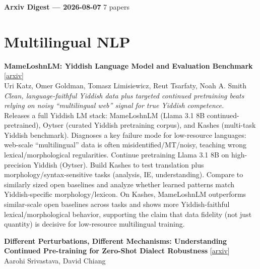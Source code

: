 \documentclass[12pt,letterpaper]{article}
\begin{document}
{\footnotesize\textbf{Arxiv Digest --- 2026-08-07} \hfill 7 papers}

\smallskip

\section*{Multilingual NLP}

{\small\textbf{MameLoshnLM: Yiddish Language Model and Evaluation Benchmark}} {\scriptsize[\href{https://arxiv.org/abs/2608.05850}{arxiv}]}\\
{\scriptsize Uri Katz, Omer Goldman, Tomasz Limisiewicz, Reut Tsarfaty, Noah A. Smith}\\

{\small\textit{Clean, language-faithful Yiddish data plus targeted continued pretraining beats relying on noisy ``multilingual web'' signal for true Yiddish competence.}}\\[1pt]
{\footnotesize Releases a full Yiddish LM stack: MameLoshnLM (Llama 3.1 8B continued-pretrained), Oytser (curated Yiddish pretraining corpus), and Kashes (multi-task Yiddish benchmark). Diagnoses a key failure mode for low-resource languages: web-scale ``multilingual'' data is often misidentified/MT/noisy, teaching wrong lexical/morphological regularities. Continue pretraining Llama 3.1 8B on high-precision Yiddish (Oytser). Build Kashes to test translation plus morphology/syntax-sensitive tasks (analysis, IE, understanding). Compare to similarly sized open baselines and analyze whether learned patterns match Yiddish-specific morphology/lexicon. On Kashes, MameLoshnLM outperforms similar-scale open baselines across tasks and shows more Yiddish-faithful lexical/morphological behavior, supporting the claim that data fidelity (not just quantity) is decisive for low-resource multilingual training.}

\medskip

{\small\textbf{Different Perturbations, Different Mechanisms: Understanding Continued Pre-training for Zero-Shot Dialect Robustness}} {\scriptsize[\href{https://arxiv.org/abs/2608.05510}{arxiv}]}\\
{\scriptsize Aarohi Srivastava, David Chiang}\\
\end{document}
